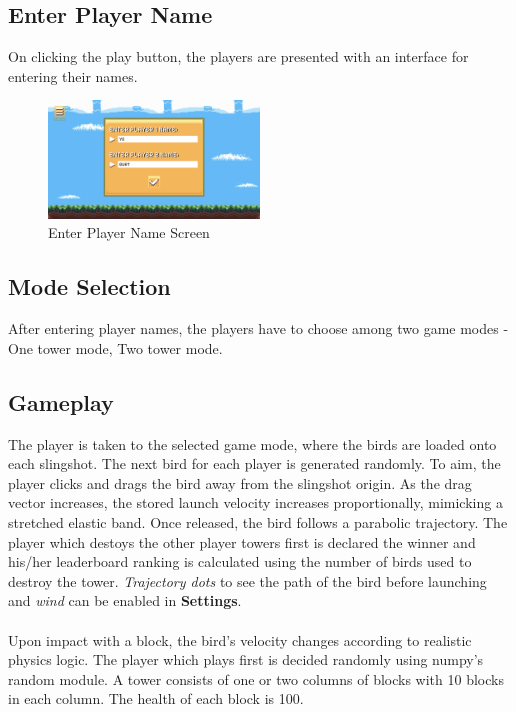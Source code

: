 \documentclass[10pt]{article}
\begin{document}
\subsection{Enter Player Name}
On clicking the play button, the players are presented with an interface for entering their names.

\begin{figure}[H]
    \centering
    \includegraphics[width=0.5\textwidth]{enterplayername.png}
    \caption{Enter Player Name Screen}
\end{figure}

\subsection{Mode Selection}
After entering player names, the players have to choose among two game modes - One tower mode, Two tower mode.

\subsection{Gameplay}
The player is taken to the selected game mode, where the birds are loaded onto each slingshot. The next bird for each player is generated randomly.
To aim, the player clicks and drags the bird away from the slingshot origin. As the drag vector increases, the stored launch velocity increases proportionally, mimicking a stretched elastic band. Once released, the bird follows a parabolic trajectory.
The player which destoys the other player towers first is declared the winner and his/her leaderboard ranking is calculated using the number of birds used to destroy the tower.
\textit{Trajectory dots} to see the path of the bird before launching and \textit{wind} can be enabled in \textbf{Settings}. \\ \\
Upon impact with a block, the bird's velocity changes according to realistic physics logic. The player which plays first is decided randomly using numpy's random module. A tower consists of one or two columns of blocks with 10 blocks in each column. The health of each block is 100.
\end{document}
